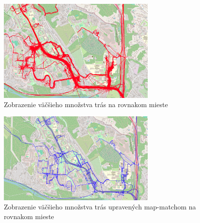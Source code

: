 \begin{figure}[H]
  \centering
  \includegraphics[width=0.7\textwidth]{img/map-match rozdiel/pred map-match.png}
  \caption{Zobrazenie väčšieho množstva trás na rovnakom mieste}
  \label{fig:spagety}
\end{figure}
\begin{figure}[H]
  \centering
  \includegraphics[width=0.7\textwidth]{img/map-match rozdiel/po map-match.png}
  \caption{Zobrazenie väčšieho množstva trás upravených map-matchom na rovnakom mieste}
  \label{fig:niespagety}
\end{figure}